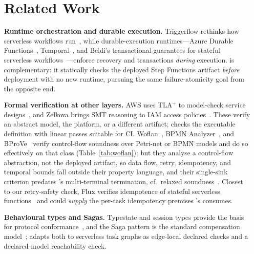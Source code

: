 \section{Related Work}
\label{sec:related}

\textbf{Runtime orchestration and durable execution.} Triggerflow rethinks how serverless
workflows run~\cite{arjona2021triggerflow}, while durable-execution runtimes---Azure Durable
Functions~\cite{burckhardt2021durable}, Temporal~\cite{temporal}, and Beldi's transactional
guarantees for stateful serverless workflows~\cite{zhang2020beldi}---enforce recovery and
transactions \emph{during} execution. \tool{} is complementary: it statically checks the deployed
Step Functions artifact \emph{before} deployment with no new runtime, pursuing the same
failure-atomicity goal from the opposite end.

\textbf{Formal verification at other layers.} AWS uses TLA$^{+}$ to model-check service
designs~\cite{newcombe2015awsformal}, and Zelkova brings SMT reasoning to IAM access
policies~\cite{backes2018zelkova}. These verify an abstract model, the platform, or a different
artifact; \tool{} checks the executable \asl{} definition with linear passes suitable for CI.
Woflan~\cite{woflan}, BPMN Analyzer~\cite{bpmnanalyzer}, and
BProVe~\cite{bprove} verify control-flow soundness over Petri-net or BPMN models
and do so effectively on that class (Table~\ref{tab:woflan}); but they analyse a control-flow
abstraction, not the deployed \asl{} artifact, so data flow, retry, idempotency, and temporal
bounds fall outside their property language, and their single-sink criterion predates \asl{}'s
multi-terminal termination, cf.\ relaxed soundness~\cite{dehnert2001relaxed}.
Closest to our retry-safety check, Flux verifies idempotence of stateful serverless
functions~\cite{ding2023flux} and could \emph{supply} the per-task idempotency premises \tool{}'s
 consumes.

\textbf{Behavioural types and Sagas.} Typestate and session types provide the basis for protocol
conformance~\cite{stromYemini1986typestate,honda2008multiparty}, and the Saga pattern is the
standard compensation model~\cite{garciaMolina1987sagas}; \tool{} adapts both to serverless task
graphs as edge-local declared checks and a declared-model reachability check.

